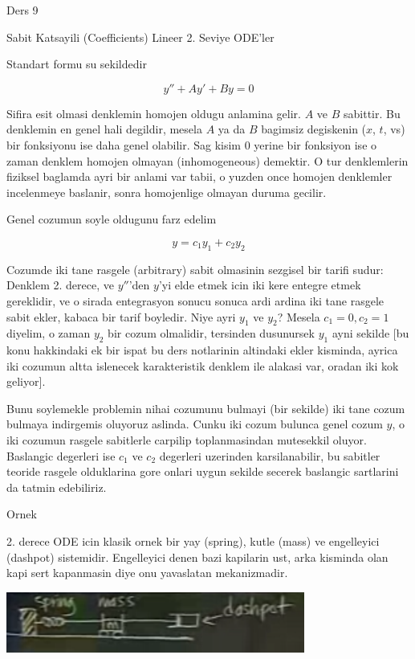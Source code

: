 \documentclass[12pt,fleqn]{article}\usepackage{../common}
\begin{document}
Ders 9

Sabit Katsayili (Coefficients) Lineer 2. Seviye ODE'ler 

Standart formu su sekildedir

\[ y'' + Ay' + By = 0 \]

Sifira esit olmasi denklemin homojen oldugu anlamina gelir. $A$ ve $B$
sabittir. Bu denklemin en genel hali degildir, mesela $A$ ya da $B$
bagimsiz degiskenin ($x$, $t$, vs) bir fonksiyonu ise daha genel
olabilir. Sag kisim 0 yerine bir fonksiyon ise o zaman denklem homojen
olmayan (inhomogeneous) demektir. O tur denklemlerin fiziksel baglamda ayri
bir anlami var tabii, o yuzden once homojen denklemler incelenmeye
baslanir, sonra homojenlige olmayan duruma gecilir.

Genel cozumun soyle oldugunu farz edelim

\[ y = c_1 y_1 + c_2 y_2 \]

Cozumde iki tane rasgele (arbitrary) sabit olmasinin sezgisel bir tarifi
sudur: Denklem 2. derece, ve $y''$'den $y$'yi elde etmek icin iki kere
entegre etmek gereklidir, ve o sirada entegrasyon sonucu sonuca ardi ardina
iki tane rasgele sabit ekler, kabaca bir tarif boyledir. Niye ayri $y_1$ ve
$y_2$?  Mesela $c_1 = 0, c_2 = 1$ diyelim, o zaman $y_2$ bir cozum
olmalidir, tersinden dusunursek $y_1$ ayni sekilde [bu konu hakkindaki ek
bir ispat bu ders notlarinin altindaki ekler kisminda, ayrica iki cozumun
altta islenecek karakteristik denklem ile alakasi var, oradan iki kok
geliyor].

Bunu soylemekle problemin nihai cozumunu bulmayi (bir sekilde) iki tane
cozum bulmaya indirgemis oluyoruz aslinda. Cunku iki cozum bulunca genel
cozum $y$, o iki cozumun rasgele sabitlerle carpilip toplanmasindan
mutesekkil oluyor. Baslangic degerleri ise $c_1$ ve $c_2$ degerleri
uzerinden karsilanabilir, bu sabitler teoride rasgele olduklarina gore
onlari uygun sekilde secerek baslangic sartlarini da tatmin edebiliriz. 

Ornek

2. derece ODE icin klasik ornek bir yay (spring), kutle (mass) ve
engelleyici (dashpot) sistemidir. Engelleyici denen bazi kapilarin ust,
arka kisminda olan kapi sert kapanmasin diye onu yavaslatan mekanizmadir.

\includegraphics[height=2cm]{9_1.png}
\end{document}

